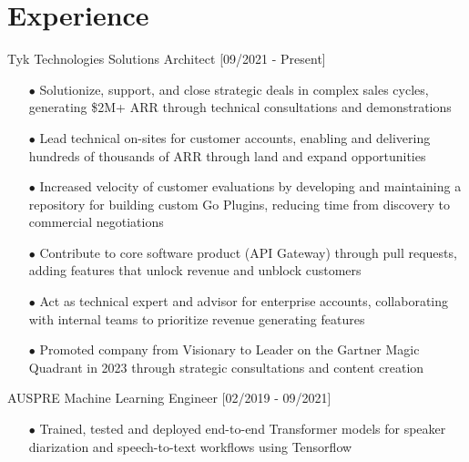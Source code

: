 \documentclass[]{twentysecondcv}
\begin{document}


\vspace{8px}
\section{Experience}
\vspace{-10px}

\begin{twenty}
  \twentyitem
    {Tyk Technologies}
    {Solutions Architect}
    {[09/2021 - Present]}
    {
    \begin{itemize}
        \item[$\bullet$] Solutionize, support, and close strategic deals in complex sales cycles, generating \$2M+ ARR through technical consultations and demonstrations 
        \item[$\bullet$] Lead technical on-sites for customer accounts, enabling and delivering hundreds of thousands of ARR through land and expand opportunities 
        \item[$\bullet$] Increased velocity of customer evaluations by developing and maintaining a repository for building custom Go Plugins, reducing time from discovery to commercial negotiations
        \item[$\bullet$] Contribute to core software product (API Gateway) through pull requests, adding features that unlock revenue and unblock customers
        \item[$\bullet$] Act as technical expert and advisor for enterprise accounts, collaborating with internal teams to prioritize revenue generating features 
        \item[$\bullet$] Promoted company from Visionary to Leader on the Gartner Magic Quadrant in 2023 through strategic consultations and content creation 
    \end{itemize}
    }
  \twentyitem
    {AUSPRE}
    {Machine Learning Engineer}
    {[02/2019 - 09/2021]}
    {
    \begin{itemize}
        \item[$\bullet$] Trained, tested and deployed end-to-end Transformer models for speaker diarization and speech-to-text workflows using Tensorflow

\end{itemize}}
\end{twenty}
\end{document}
